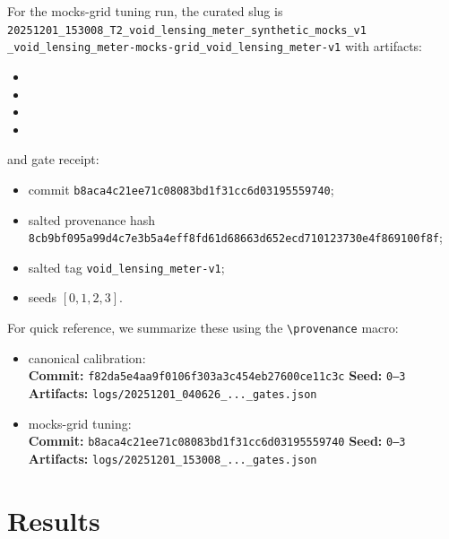 \documentclass{article}
\newcommand{\provenance}[3]{\textbf{Commit:} \texttt{#1}\quad
  \textbf{Seed:} \texttt{#2}\quad
  \textbf{Artifacts:} \texttt{#3}}
\begin{document}
For the mocks-grid tuning run, the curated slug is
\texttt{20251201\_153008\_T2\_void\_lensing\_meter\_synthetic\_mocks\_v1}\\
\texttt{\_void\_lensing\_meter-mocks-grid\_void\_lensing\_meter-v1}
with artifacts:
\begin{itemize}
  \item {}
  \item {}
  \item {}
  \item {}
\end{itemize}
and gate receipt:
\begin{itemize}
  \item commit \texttt{b8aca4c21ee71c08083bd1f31cc6d03195559740};
  \item salted provenance hash
    \texttt{8cb9bf095a99d4c7e3b5a4eff8fd61d68663d652ecd710123730e4f869100f8f};
  \item salted tag \texttt{void\_lensing\_meter-v1};
  \item seeds $[0,1,2,3]$.
\end{itemize}

For quick reference, we summarize these using the \texttt{\textbackslash provenance} macro:
\begin{itemize}
  \item canonical calibration:\\
    \provenance{f82da5e4aa9f0106f303a3c454eb27600ce11c3c}{0--3}{logs/20251201\_040626\_...\_gates.json}
  \item mocks-grid tuning:\\
    \provenance{b8aca4c21ee71c08083bd1f31cc6d03195559740}{0--3}{logs/20251201\_153008\_...\_gates.json}
\end{itemize}

\section{Results}
\end{document}
